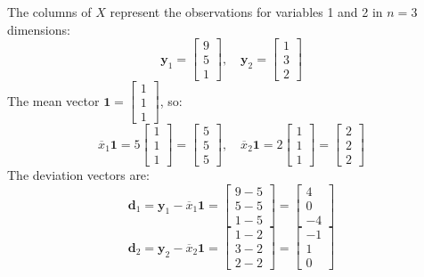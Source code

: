 \documentclass[11pt,a4paper]{article}
\begin{document}
The columns of $X$ represent the observations for variables 1 and 2 in $n=3$ dimensions:
\[
\mathbf{y}_1 = \begin{bmatrix} 9 \\ 5 \\ 1 \end{bmatrix}, \quad \mathbf{y}_2 = \begin{bmatrix} 1 \\ 3 \\ 2 \end{bmatrix}
\]
The mean vector $\mathbf{1} = \begin{bmatrix} 1 \\ 1 \\ 1 \end{bmatrix}$, so:
\[
\overline{x}_1\mathbf{1} = 5 \begin{bmatrix} 1 \\ 1 \\ 1 \end{bmatrix} = \begin{bmatrix} 5 \\ 5 \\ 5 \end{bmatrix}, \quad \overline{x}_2\mathbf{1} = 2 \begin{bmatrix} 1 \\ 1 \\ 1 \end{bmatrix} = \begin{bmatrix} 2 \\ 2 \\ 2 \end{bmatrix}
\]
The deviation vectors are:
\[
\mathbf{d}_1 = \mathbf{y}_1 - \overline{x}_1\mathbf{1} = \begin{bmatrix} 9-5 \\ 5-5 \\ 1-5 \end{bmatrix} = \begin{bmatrix} 4 \\ 0 \\ -4 \end{bmatrix}
\]
\[
\mathbf{d}_2 = \mathbf{y}_2 - \overline{x}_2\mathbf{1} = \begin{bmatrix} 1-2 \\ 3-2 \\ 2-2 \end{bmatrix} = \begin{bmatrix} -1 \\ 1 \\ 0 \end{bmatrix}
\]
\end{document}
